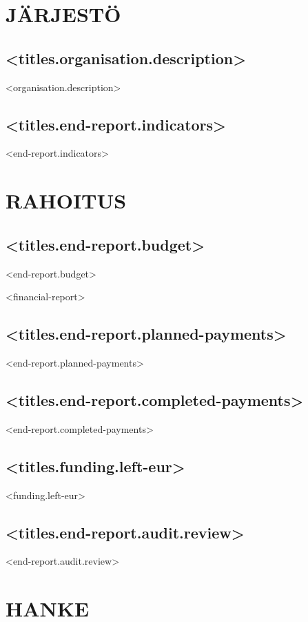 \documentclass[twoside,a4paper]{article}
\begin{document}
	\section{JÄRJESTÖ}
		
		\subsection*{<titles.organisation.description>}
		    <organisation.description>
		    
		\subsection*{<titles.end-report.indicators>}
		    <end-report.indicators>
		
	\newpage		
	\section{RAHOITUS}
		\subsection*{<titles.end-report.budget>}
		    <end-report.budget>
		    
		<financial-report>

		\subsection*{<titles.end-report.planned-payments>}
		    <end-report.planned-payments>
		
		\subsection*{<titles.end-report.completed-payments>}
		    <end-report.completed-payments>
		
		\subsection*{<titles.funding.left-eur>}
		    <funding.left-eur>
		    
		\subsection*{<titles.end-report.audit.review>}
		    <end-report.audit.review>

	\newpage		
	\section{HANKE}
\end{document}
